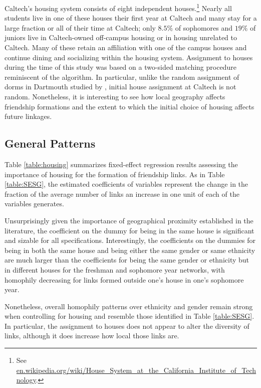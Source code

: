 \documentclass[12pt,letterpaper,english]{article}
\begin{document}
Caltech's housing system consists of eight independent houses.\footnote{See \href{https://en.wikipedia.org/wiki/House_System_at_the_California_Institute_of_Technology}{{\color{blue}en.wikipedia.org/wiki/House\_System\_at\_the\_California\_Institute\_of\_Technology}}.} Nearly all students live in one of these houses their first year at Caltech and many stay for a large fraction or all of their time at Caltech; only $8.5\%$ of sophomores and $19\%$ of juniors live in Caltech-owned off-campus housing or in housing unrelated to Caltech. Many of these retain an affiliation with one of the campus houses and continue dining and socializing within the housing system. Assignment to houses during the time of this study was based on a two-sided matching procedure reminiscent of the \cite{galeshapley1962} algorithm. In particular, unlike the random assignment of dorms in Dartmouth studied by \cite{sacerdote2001peer}, initial house assignment at Caltech is not random. Nonetheless, it is interesting to see how local geography affects friendship formations and the extent to which the initial choice of housing affects future linkages.

\subsection{General Patterns}
\label{sec:genPatterns}

Table \ref{table:housing} summarizes fixed-effect regression results assessing the importance of housing for the formation of friendship links. As in Table \ref{table:SESG}, the estimated coefficients of variables represent the change in the fraction of the average number of links an increase in one unit of each of the variables generates.

Unsurprisingly given the importance of geographical proximity established in the literature, the coefficient on the dummy for being in the same house is significant and sizable for all specifications. Interestingly, the coefficients on the dummies for being in both the same house and being either the same gender or same ethnicity are much larger than the coefficients for being the same gender or ethnicity but in different houses for the freshman and sophomore year networks, with homophily decreasing for links formed outside one's house in one's sophomore year.

Nonetheless, overall homophily patterns over ethnicity and gender remain strong when controlling for housing and resemble those identified in Table  \ref{table:SESG}. In particular, the assignment to houses does not appear to alter the diversity of links, although it does increase how local those links are.
\end{document}
